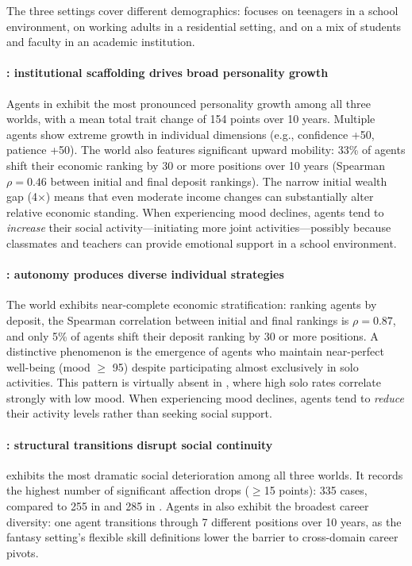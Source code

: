 The three settings cover different demographics:
\campus{} focuses on teenagers in a school environment,
\apartment{} on working adults in a residential setting,
and \academy{} on a mix of students and faculty in an academic institution.

\paragraph{\campus{}: institutional scaffolding drives broad personality growth}
Agents in \campus{} exhibit the most pronounced personality growth
among all three worlds,
with a mean total trait change of 154 points over 10 years.
Multiple agents show extreme growth in individual dimensions
(e.g., confidence +50, patience +50).
The world also features significant upward mobility:
33\% of agents shift their economic ranking by 30 or more positions over 10 years
(Spearman $\rho = 0.46$ between initial and final deposit rankings).
The narrow initial wealth gap (4$\times$) means that even moderate income changes
can substantially alter relative economic standing.
When experiencing mood declines,
\campus{} agents tend to \textit{increase} their social activity---initiating
more joint activities---possibly because
classmates and teachers can provide emotional support in a school environment.

\paragraph{\apartment{}: autonomy produces diverse individual strategies}
The world exhibits near-complete economic stratification:
ranking agents by deposit, the Spearman correlation between initial and final rankings is $\rho = 0.87$,
and only 5\% of agents shift their deposit ranking by 30 or more positions.
A distinctive phenomenon is the emergence of agents
who maintain near-perfect well-being (mood $\geq$ 95) despite
participating almost exclusively in solo activities.
This pattern is virtually absent in \campus{},
where high solo rates correlate strongly with low mood.
When experiencing mood declines,
\apartment{} agents tend to \textit{reduce} their activity levels
rather than seeking social support.

\paragraph{\academy{}: structural transitions disrupt social continuity}
\academy{} exhibits the most dramatic social deterioration among all three worlds.
It records the highest number of significant affection drops
($\geq$15 points): 335 cases, compared to 255 in \campus{} and 285 in \apartment{}.
Agents in \academy{} also exhibit the broadest career diversity:
one agent transitions through 7 different positions over 10 years,
as the fantasy setting's flexible skill definitions lower the barrier
to cross-domain career pivots.


